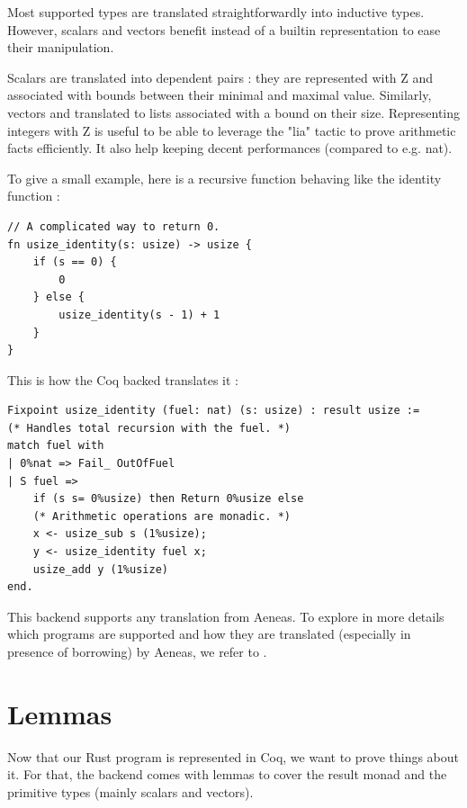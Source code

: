 \documentclass{article}
\begin{document}
\medskip

Most supported types are translated straightforwardly into inductive types. However, scalars and vectors benefit instead of a builtin representation to ease their manipulation.

Scalars are translated into dependent pairs : they are represented with Z and associated with bounds between their minimal and maximal value. Similarly, vectors and translated to lists associated with a bound on their size. Representing integers with Z is useful to be able to leverage the "lia" tactic to prove arithmetic facts efficiently. It also help keeping decent performances (compared to e.g. nat).

\medskip

To give a small example, here is a recursive function behaving like the identity function :

\begin{verbatim}
// A complicated way to return 0.
fn usize_identity(s: usize) -> usize {
    if (s == 0) {
        0
    } else {
        usize_identity(s - 1) + 1
    }
}
\end{verbatim}

This is how the Coq backed translates it :

\begin{verbatim}
Fixpoint usize_identity (fuel: nat) (s: usize) : result usize :=
(* Handles total recursion with the fuel. *)
match fuel with
| 0%nat => Fail_ OutOfFuel
| S fuel =>
    if (s s= 0%usize) then Return 0%usize else
    (* Arithmetic operations are monadic. *)
    x <- usize_sub s (1%usize);
    y <- usize_identity fuel x;
    usize_add y (1%usize)
end.
\end{verbatim}

This backend supports any translation from Aeneas. To explore in more details which programs are supported and how they are translated (especially in presence of borrowing) by Aeneas, we refer to \cite{Aeneas}.

\section{Lemmas}
\label{sec:Lemmas}

Now that our Rust program is represented in Coq, we want to prove things about it. For that, the backend comes with lemmas to cover the result monad and the primitive types (mainly scalars and vectors).
\end{document}
